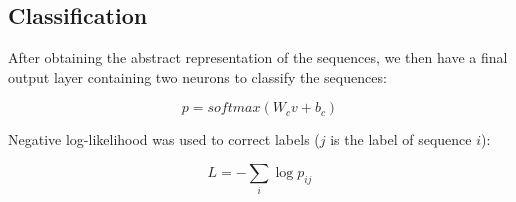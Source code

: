 \subsection{Classification}


After obtaining the abstract representation of the sequences, 
we then have a final output layer containing two neurons to classify the sequences:

\begin{equation*}
	p = softmax(W_c v + b_c)
\end{equation*}

Negative log-likelihood was used to correct labels ($j$ is the label of sequence $i$): 

\begin{equation*}
	L = - \sum_{i} \log{p_{ij}}
\end{equation*}

